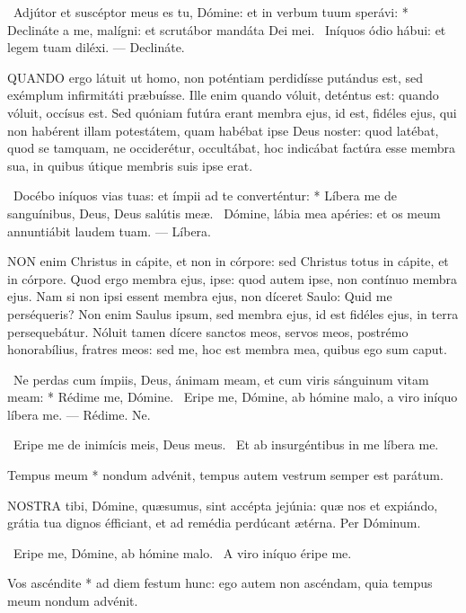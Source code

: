 \R\ Adjútor et suscéptor meus es tu, Dómine: et in verbum tuum sperávi: * Declináte a me, malígni: et scrutábor mandáta Dei mei. \V\ Iníquos ódio hábui: et legem tuam diléxi. --- Declináte.


\lettrine[lines=2]{Q}{UANDO} ergo látuit ut homo, non poténtiam perdidísse putándus est, sed exémplum infirmitáti præbuísse. Ille enim quando vóluit, deténtus est: quando vóluit, occísus est. Sed quóniam futúra erant membra ejus, id est, fidéles ejus, qui non habérent illam potestátem, quam habébat ipse Deus noster: quod latébat, quod se tamquam, ne occiderétur, occultábat, hoc indicábat factúra esse membra sua, in quibus útique membris suis ipse erat.

\R\ Docébo iníquos vias tuas: et ímpii ad te converténtur: * Líbera me de sanguínibus, Deus, Deus salútis meæ. \V\ Dómine, lábia mea apéries: et os meum annuntiábit laudem tuam. --- Líbera.


\lettrine[lines=2]{N}{ON} enim Christus in cápite, et non in córpore: sed Christus totus in cápite, et in córpore. Quod ergo membra ejus, ipse: quod autem ipse, non contínuo membra ejus. Nam si non ipsi essent membra ejus, non díceret Saulo: Quid me perséqueris? Non enim Saulus ipsum, sed membra ejus, id est fidéles ejus, in terra persequebátur. Nóluit tamen dícere sanctos meos, servos meos, postrémo honorabílius, fratres meos: sed me, hoc est membra mea, quibus ego sum caput.

\R\ Ne perdas cum ímpiis, Deus, ánimam meam, et cum viris sánguinum vitam meam: * Rédime me, Dómine. \V\ Eripe me, Dómine, ab hómine malo, a viro iníquo líbera me. --- Rédime. Ne.

\V\ Eripe me de inimícis meis, Deus meus. \R\ Et ab insurgéntibus in me líbera me.

 Tempus meum * nondum advénit, tempus autem vestrum semper est parátum.


\lettrine[lines=2]{N}{OSTRA} tibi, Dómine, quæsumus, sint accépta jejúnia: quæ nos et expiándo, grátia tua dignos éfficiant, et ad remédia perdúcant ætérna. Per Dóminum.

\V\ Eripe me, Dómine, ab hómine malo. \R\ A viro iníquo éripe me.

 Vos ascéndite * ad diem festum hunc: ego autem non ascéndam, quia tempus meum nondum advénit.

